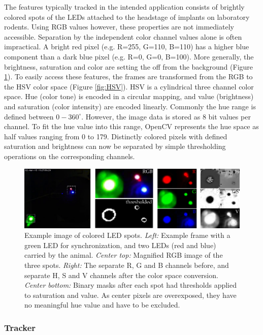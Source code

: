 The features typically tracked in the intended application consists of brightly colored spots of the LEDs attached to the headstage of implants on laboratory rodents. Using RGB values however, these properties are not immediately accessible. Separation by the independent color channel values alone is often impractical. A bright red pixel (e.g. R=255, G=110, B=110) has a higher blue component than a dark blue pixel (e.g. R=0, G=0, B=100). More generally, the brightness, saturation and color are setting the off from the background (Figure \ref{fig:frames}). To easily access these features, the frames are transformed from the RGB to the HSV color space (Figure \ref{fig:HSV}). HSV is a cylindrical three channel color space. Hue (color tone) is encoded in a circular mapping, and value (brightness) and saturation (color intensity) are encoded linearly. Commonly the hue range is defined between $0-360^{\circ}$. However, the image data is stored as 8 bit values per channel. To fit the hue value into this range, OpenCV represents the hue space as half values ranging from 0 to 179. Distinctly colored pixels with defined saturation and brightness can now be separated by simple thresholding operations on the corresponding channels.

\begin{figure}[ht] %
	\centering
		\includegraphics [width=\linewidth]{gfx/HSV_conversion.pdf} %
	\caption[Test]{Example image of colored LED spots. \emph{Left:} Example frame with a green LED for synchronization, and two LEDs (red and blue) carried by the animal. \emph{Center top:} Magnified RGB image of the three spots. \emph{Right:} The separate R, G and B channels before, and separate H, S and V channels after the color space conversion. \emph{Center bottom:} Binary masks after each spot had thresholds applied to saturation and value. As center pixels are overexposed, they have no meaningful hue value and have to be excluded.}
	\label{fig:frames}
\end{figure}


\subsubsection{Tracker}
\label{sec:Tracker}

